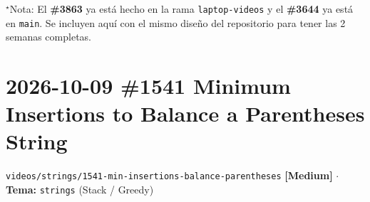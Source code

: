 \documentclass[letterpaper,10pt]{article}
\newcommand{\folder}[1]{\texttt{\textcolor{mcgreen}{#1}}}
\newcommand{\badge}[2]{\textbf{\textcolor{#1}{[#2]}}}
\begin{document}
{\footnotesize $^\star$Nota: El \textbf{\#3863} ya est\'a hecho en la rama \texttt{laptop-videos} y el \textbf{\#3644} ya est\'a en \texttt{main}. Se incluyen aqu\'i con el mismo dise\~no del repositorio para tener las 2 semanas completas.}

\newpage

\section{2026-10-09 \textbar{} \#1541 Minimum Insertions to Balance a Parentheses String}
\folder{videos/strings/1541-min-insertions-balance-parentheses} \hfill \badge{mcgold}{Medium} $\cdot$ \textbf{Tema:} \texttt{strings} (Stack / Greedy)
\end{document}
